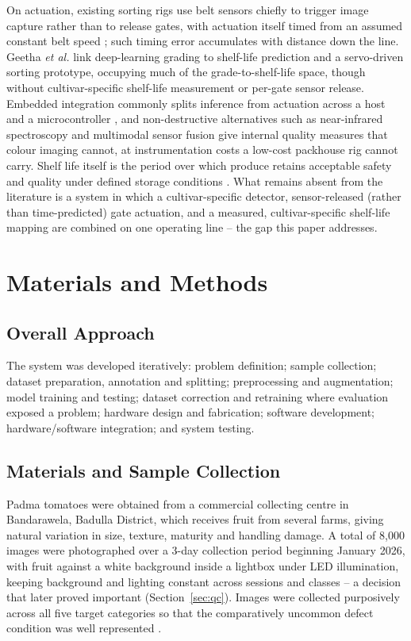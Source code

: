 \documentclass[journal]{IEEEtran}
\begin{document}
On actuation, existing sorting rigs use belt sensors chiefly to trigger image capture rather than to release gates, with actuation itself timed from an assumed constant belt speed \cite{moya2025}; such timing error accumulates with distance down the line. Geetha \textit{et al.} \cite{geetha2025} link deep-learning grading to shelf-life prediction and a servo-driven sorting prototype, occupying much of the grade-to-shelf-life space, though without cultivar-specific shelf-life measurement or per-gate sensor release. Embedded integration commonly splits inference from actuation across a host and a microcontroller \cite{patria2025,saxena2025}, and non-destructive alternatives such as near-infrared spectroscopy \cite{borba2021} and multimodal sensor fusion \cite{liu2024} give internal quality measures that colour imaging cannot, at instrumentation costs a low-cost packhouse rig cannot carry. Shelf life itself is the period over which produce retains acceptable safety and quality under defined storage conditions \cite{tarlak2023}. What remains absent from the literature is a system in which a cultivar-specific detector, sensor-released (rather than time-predicted) gate actuation, and a measured, cultivar-specific shelf-life mapping are combined on one operating line -- the gap this paper addresses.

\section{Materials and Methods}
\label{sec:methods}

\subsection{Overall Approach}
The system was developed iteratively: problem definition; sample collection; dataset preparation, annotation and splitting; preprocessing and augmentation; model training and testing; dataset correction and retraining where evaluation exposed a problem; hardware design and fabrication; software development; hardware/software integration; and system testing.

\subsection{Materials and Sample Collection}
Padma tomatoes were obtained from a commercial collecting centre in Bandarawela, Badulla District, which receives fruit from several farms, giving natural variation in size, texture, maturity and handling damage. A total of 8{,}000 images were photographed over a 3-day collection period beginning January 2026, with fruit against a white background inside a lightbox under LED illumination, keeping background and lighting constant across sessions and classes -- a decision that later proved important (Section~\ref{sec:qc}). Images were collected purposively across all five target categories so that the comparatively uncommon defect condition was well represented \cite{etikan2016}.
\end{document}
